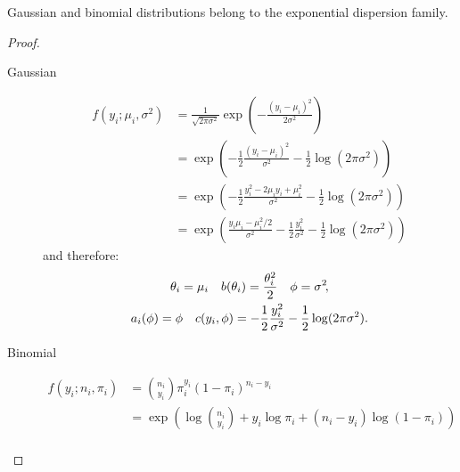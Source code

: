 \begin{proposition*}
    Gaussian and binomial distributions belong to the exponential dispersion family.
\end{proposition*}

\begin{proof}\leavevmode
    \begin{description}
        \item[Gaussian]
              \begin{equation}
                  \begin{aligned}
                      f(y_i; \mu_i, \sigma^2) & = \frac{1}{\sqrt{2\pi\sigma^2}} \exp\left(-\frac{(y_i - \mu_i)^2}{2\sigma^2}\right)                                          \\
                                              & = \exp\left(-\frac{1}{2}\frac{(y_i - \mu_i)^2}{\sigma^2} - \frac{1}{2}\log(2\pi\sigma^2)\right)                              \\
                                              & = \exp\left(-\frac{1}{2}\frac{y_i^2 - 2\mu_i y_i + \mu_i^2}{\sigma^2} - \frac{1}{2}\log(2\pi\sigma^2)\right)                 \\
                                              & = \exp\left(\frac{y_i\mu_i - \mu_i^2/2}{\sigma^2} - \frac{1}{2}\frac{y_i^2}{\sigma^2} - \frac{1}{2}\log(2\pi\sigma^2)\right)
                  \end{aligned}
              \end{equation}
              and therefore:
              \begin{equation}
                \begin{gathered}
                    \theta_i = \mu_i\quad b(\theta_i) = \frac{\theta_i^2}{2}\quad \phi = \sigma^2\negthinspace,\\
                     a_i(\phi) = \phi\quad c(y_i, \phi) = -\frac{1}{2}\frac{y_i^2}{\sigma^2} - \frac{1}{2}\log(2\pi\sigma^2).
                \end{gathered}
              \end{equation}
        \item[Binomial]
              \begin{equation}
                  \begin{aligned}
                      f(y_i; n_i, \pi_i) & = \binom{n_i}{y_i} \pi_i^{y_i} (1 - \pi_i)^{n_i - y_i}                                                       \\
                                         & = \exp\left(\log\binom{n_i}{y_i} + y_i \log\pi_i + (n_i - y_i)\log(1 - \pi_i)\right)                         \\

\end{aligned}
\end{equation}
\end{description}
\end{proof}
